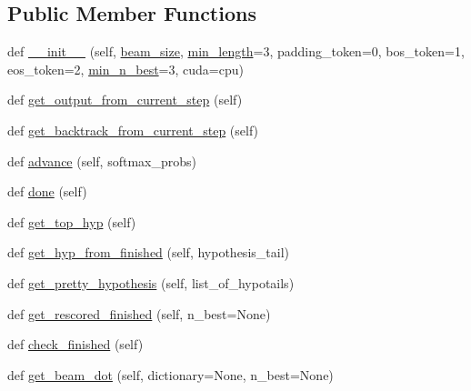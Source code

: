 \subsection*{Public Member Functions}
\begin{DoxyCompactItemize}
\item 
def \hyperlink{classparlai_1_1agents_1_1legacy__agents_1_1seq2seq_1_1utils__v0_1_1Beam_a0b15ba633165fe8ae84f7664dc893b99}{\+\_\+\+\_\+init\+\_\+\+\_\+} (self, \hyperlink{classparlai_1_1agents_1_1legacy__agents_1_1seq2seq_1_1utils__v0_1_1Beam_aa23d688e6e9c2d6ced98d57ac1a7059c}{beam\+\_\+size}, \hyperlink{classparlai_1_1agents_1_1legacy__agents_1_1seq2seq_1_1utils__v0_1_1Beam_a7d6ef73f817ea0cddaaa2857f5fab206}{min\+\_\+length}=3, padding\+\_\+token=0, bos\+\_\+token=1, eos\+\_\+token=2, \hyperlink{classparlai_1_1agents_1_1legacy__agents_1_1seq2seq_1_1utils__v0_1_1Beam_a7709dc9d035f249283776d08ca4d93c8}{min\+\_\+n\+\_\+best}=3, cuda=\textquotesingle{}cpu\textquotesingle{})
\item 
def \hyperlink{classparlai_1_1agents_1_1legacy__agents_1_1seq2seq_1_1utils__v0_1_1Beam_a76fadcbf18352eb7f2d741e9b04e0a6a}{get\+\_\+output\+\_\+from\+\_\+current\+\_\+step} (self)
\item 
def \hyperlink{classparlai_1_1agents_1_1legacy__agents_1_1seq2seq_1_1utils__v0_1_1Beam_a6deaa656e21fd41fafd2958a97ebea18}{get\+\_\+backtrack\+\_\+from\+\_\+current\+\_\+step} (self)
\item 
def \hyperlink{classparlai_1_1agents_1_1legacy__agents_1_1seq2seq_1_1utils__v0_1_1Beam_ad45cf956539e1b9cdb38e6ebb2514843}{advance} (self, softmax\+\_\+probs)
\item 
def \hyperlink{classparlai_1_1agents_1_1legacy__agents_1_1seq2seq_1_1utils__v0_1_1Beam_ac37b26314438d9e94b03e5a45efaf5dd}{done} (self)
\item 
def \hyperlink{classparlai_1_1agents_1_1legacy__agents_1_1seq2seq_1_1utils__v0_1_1Beam_abbb522afdc69dbce77f997dd392c5c1d}{get\+\_\+top\+\_\+hyp} (self)
\item 
def \hyperlink{classparlai_1_1agents_1_1legacy__agents_1_1seq2seq_1_1utils__v0_1_1Beam_a2df9b1e26c3f35c7149e4d7ae75c2f03}{get\+\_\+hyp\+\_\+from\+\_\+finished} (self, hypothesis\+\_\+tail)
\item 
def \hyperlink{classparlai_1_1agents_1_1legacy__agents_1_1seq2seq_1_1utils__v0_1_1Beam_a9e16b7ec90640b527d75642fe93c6417}{get\+\_\+pretty\+\_\+hypothesis} (self, list\+\_\+of\+\_\+hypotails)
\item 
def \hyperlink{classparlai_1_1agents_1_1legacy__agents_1_1seq2seq_1_1utils__v0_1_1Beam_a3c573eb1104002cb7da1483a6afb3cfe}{get\+\_\+rescored\+\_\+finished} (self, n\+\_\+best=None)
\item 
def \hyperlink{classparlai_1_1agents_1_1legacy__agents_1_1seq2seq_1_1utils__v0_1_1Beam_abea53933203e2126e38657efe715b8b5}{check\+\_\+finished} (self)
\item 
def \hyperlink{classparlai_1_1agents_1_1legacy__agents_1_1seq2seq_1_1utils__v0_1_1Beam_a0f15f5dc35437659d1ab17d4508d3abe}{get\+\_\+beam\+\_\+dot} (self, dictionary=None, n\+\_\+best=None)
\end{DoxyCompactItemize}
